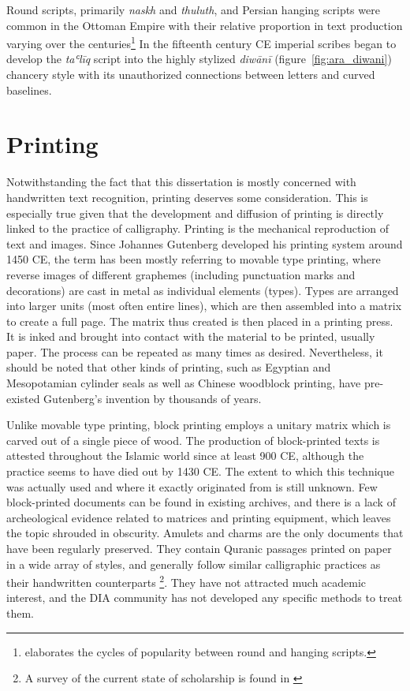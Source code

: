 Round scripts, primarily \emph{naskh} and \emph{thuluth}, and Persian hanging
scripts were common in the Ottoman Empire with their relative proportion in
text production varying over the centuries\footnote{\cite[chapter
XI]{blair2006islamic} elaborates the cycles of popularity between round and
hanging scripts.} In the fifteenth century CE imperial scribes began to develop
the \emph{taʿlīq} script into the highly stylized \emph{diwānī}
(figure~\ref{fig:ara_diwani}) chancery style with its unauthorized connections
between letters and curved baselines.

\section{Printing}

Notwithstanding the fact that this dissertation is mostly concerned with
handwritten text recognition, printing deserves some consideration. This is
especially true given that the development and diffusion of printing is
directly linked to the practice of calligraphy. Printing is the mechanical
reproduction of text and images. Since Johannes Gutenberg developed his
printing system around 1450 CE, the term has been mostly referring to movable
type printing, where reverse images of different graphemes (including
punctuation marks and decorations) are cast in metal as individual elements
(types). Types are arranged into larger units (most often entire lines), which
are then assembled into a matrix to create a full page. The matrix thus created
is then placed in a printing press. It is inked and brought into contact with
the material to be printed, usually paper. The process can be repeated as many
times as desired. Nevertheless, it should be noted that other kinds of
printing, such as Egyptian and Mesopotamian cylinder seals as well as Chinese
woodblock printing, have pre-existed Gutenberg's invention by thousands of
years. 

Unlike movable type printing, block printing employs a unitary matrix which is
carved out of a single piece of wood. The production of block-printed texts is
attested throughout the Islamic world since at least 900 CE, although the
practice seems to have died out by 1430 CE. The extent to which this technique
was actually used and where it exactly originated from is still unknown. Few
block-printed documents can be found in existing archives, and there is a lack
of archeological evidence related to matrices and printing equipment, which
leaves the topic shrouded in obscurity. Amulets and charms are the only
documents that have been regularly preserved. They contain Quranic passages
printed on paper in a wide array of styles, and generally follow similar
calligraphic practices as their handwritten counterparts \footnote{A survey of
the current state of scholarship is found in \cite{schaefer2006enigmatic}}.
They have not attracted much academic interest, and the DIA community has not
developed any specific methods to treat them. 

